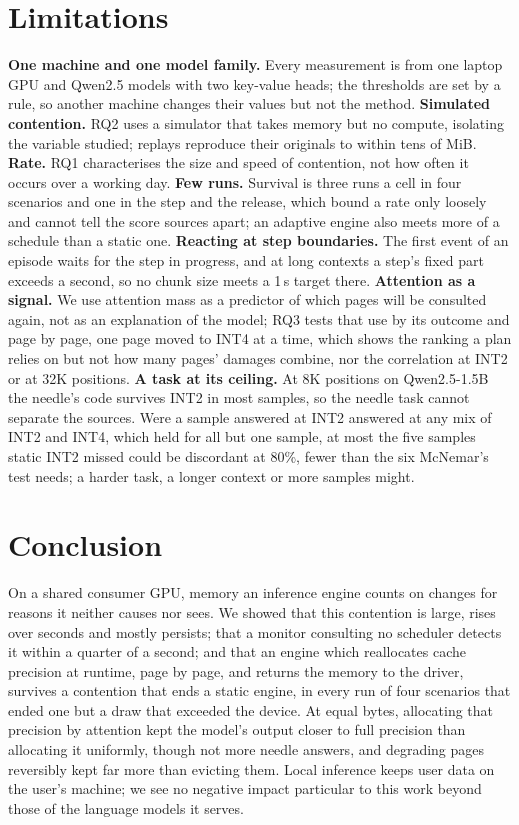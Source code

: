 \documentclass{article}
\begin{document}
\section{Limitations}
\label{sec:limitations}

\textbf{One machine and one model family.} Every measurement is from one
laptop GPU and Qwen2.5 models with two key-value heads; the thresholds are set
by a rule, so another machine changes their values but not the method.
\textbf{Simulated contention.} RQ2 uses a simulator that takes memory but no
compute, isolating the variable studied; replays reproduce their originals to
within tens of MiB. \textbf{Rate.} RQ1 characterises the size and speed of
contention, not how often it occurs over a working day. \textbf{Few runs.}
Survival is three runs a cell in four scenarios and one in the step and the
release, which bound a rate only loosely and cannot tell the score sources
apart; an adaptive engine also meets more of a schedule than a static one. \textbf{Reacting at step
boundaries.} The first event of an episode waits for the step in progress, and
at long contexts a step's fixed part exceeds a second, so no chunk size meets a
1\,s target there. \textbf{Attention as a signal.} We use attention mass as a
predictor of which pages will be consulted again, not as an explanation of the
model; RQ3 tests that use by its outcome and page by page, one page moved to
INT4 at a time, which shows the ranking a plan relies on but not how many
pages' damages combine, nor the correlation at INT2 or at 32K positions. \textbf{A task at
its ceiling.} At 8K positions on Qwen2.5-1.5B the needle's code survives INT2
in most samples, so the needle task cannot separate the sources. Were a sample
answered at INT2 answered at any mix of INT2 and INT4, which held for all but
one sample, at most the five samples static INT2 missed could be discordant at
80\%, fewer than the six McNemar's
test needs; a harder task, a longer context or more samples might.

\section{Conclusion}
\label{sec:conclusion}

On a shared consumer GPU, memory an inference engine counts on changes for
reasons it neither causes nor sees. We showed that this contention is large,
rises over seconds and mostly persists; that a monitor consulting no scheduler
detects it within a quarter of a second; and that an engine which reallocates
cache precision at runtime, page by page, and returns the memory to the driver,
survives a contention that ends a static engine, in every run of four scenarios
that ended one but a draw that exceeded the device. At equal bytes, allocating
that precision by attention kept the model's output closer to full precision
than allocating it uniformly, though not more needle answers, and degrading
pages reversibly kept far more than evicting them. Local inference keeps user
data on the user's machine; we see no negative impact particular to this work
beyond those of the language models it serves.
\end{document}
